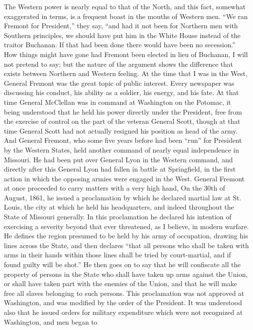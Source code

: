 The Western power is nearly equal to that of the North, and this
fact, somewhat exaggerated in terms, is a frequent boast in the
mouths of Western men.  ``We ran Fremont for President,'' they say,
``and had it not been for Northern men with Southern principles, we
should have put him in the White House instead of the traitor
Buchanan.  If that had been done there would have been no
secession.''  How things might have gone had Fremont been elected in
lieu of Buchanan, I will not pretend to say; but the nature of the
argument shows the difference that exists between Northern and
Western feeling.  At the time that I was in the West, General
Fremont was the great topic of public interest.  Every newspaper
was discussing his conduct, his ability as a soldier, his energy,
and his fate.  At that time General McClellan was in command at
Washington on the Potomac, it being understood that he held his
power directly under the President, free from the exercise of
control on the part of the veteran General Scott, though at that
time General Scott had not actually resigned his position as head
of the army.  And General Fremont, who some five years before had
been ``run'' for President by the Western States, held another
command of nearly equal independence in Missouri.  He had been put
over General Lyon in the Western command, and directly after this
General Lyon had fallen in battle at Springfield, in the first
action in which the opposing armies were engaged in the West.
General Fremont at once proceeded to carry matters with a very high
hand, On the 30th of August, 1861, he issued a proclamation by
which he declared martial law at St. Louis, the city at which he
held his headquarters, and indeed throughout the State of Missouri
generally.  In this proclamation he declared his intention of
exercising a severity beyond that ever threatened, as I believe, in
modern warfare.  He defines the region presumed to be held by his
army of occupation, drawing his lines across the State, and then
declares ``that all persons who shall be taken with arms in their
hands within those lines shall be tried by court-martial, and if
found guilty will be shot.''  He then goes on to say that he will
confiscate all the property of persons in the State who shall have
taken up arms against the Union, or shall have taken part with the
enemies of the Union, and that he will make free all slaves
belonging to such persons.  This proclamation was not approved at
Washington, and was modified by the order of the President.  It was
understood also that he issued orders for military expenditure
which were not recognized at Washington, and men began to
